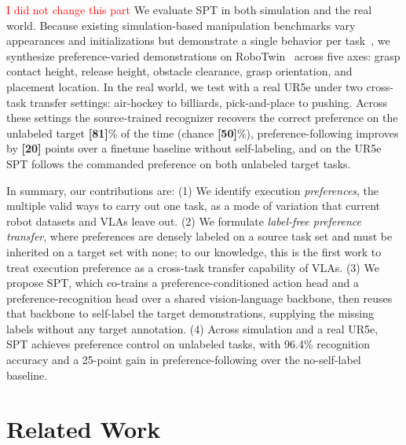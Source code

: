 \documentclass{article}
\begin{document}
\textcolor{red}{I did not change this part}
We evaluate SPT in both simulation and the real world. Because existing simulation-based manipulation benchmarks vary appearances and initializations but demonstrate a single behavior per task~\citep{libero, liberoplus}, we synthesize preference-varied demonstrations on RoboTwin~\citep{robotwin} across five axes: grasp contact height, release height, obstacle clearance, grasp orientation, and placement location. In the real world, we test with a real UR5e under two cross-task transfer settings: air-hockey to billiards, pick-and-place to pushing.
Across these settings the source-trained recognizer recovers the correct preference on the unlabeled target \textbf{[81]}\% of the time (chance \textbf{[50]}\%), preference-following improves by \textbf{[20]} points over a finetune baseline without self-labeling, and on the UR5e SPT follows the commanded preference on both unlabeled target tasks.

In summary, our contributions are:
(1) We identify execution \emph{preferences}, the multiple valid ways to carry out one task, as a mode of variation that current robot datasets and VLAs leave out.
(2) We formulate \emph{label-free preference transfer}, where preferences are densely labeled on a source task set and must be inherited on a target set with none; to our knowledge, this is the first work to treat execution preference as a cross-task transfer capability of VLAs.
(3) We propose SPT, which co-trains a preference-conditioned action head and a preference-recognition head over a shared vision-language backbone, then reuses that backbone to self-label the target demonstrations, supplying the missing labels without any target annotation.
(4) Across simulation and a real UR5e, SPT achieves preference control on unlabeled tasks, with 96.4\% recognition accuracy and a 25-point gain in preference-following over the no-self-label baseline.

 




\section{Related Work}
\label{sec:related}
\end{document}
